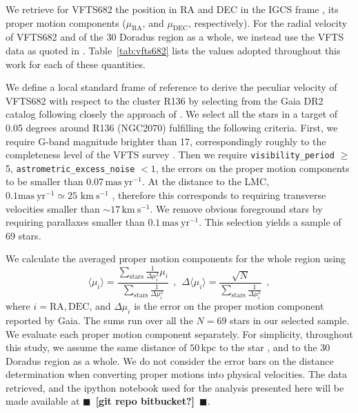 \documentclass[apjl,twocolumn]{emulateapj}
\newcommand{\todo}[1]{{\large $\blacksquare$~\textbf{\color{red}[#1]}}~$\blacksquare$}
\newcommand{\kms}{{\,\mathrm{km\ s^{-1}}}}
\DeclareRobustCommand{\Tabref}[1]{Table~\ref{#1}}
\begin{document}
We retrieve for VFTS682 the position in RA and DEC
in the IGCS frame \cite[][]{brown:18}, its
proper motion components ($\mu_\mathrm{RA}$, and $\mu_\mathrm{DEC}$,
respectively). For the radial velocity of VFTS682 and of the 30 Doradus
region as a whole, we instead use the VFTS data
as quoted in \cite{bestenlehner:11}. \Tabref{tab:vfts682} lists the values adopted throughout
this work for each of these quantities.


We define a local standard frame of reference to derive the peculiar velocity
of VFTS682 with respect to the cluster R136 by selecting from the Gaia DR2 catalog following closely the approach of \cite{vandermarel:02,lennon:18}.
We select all the stars in a target of 0.05 degrees around R136
(NGC2070) fulfilling the following criteria. First, we require G-band
magnitude brighter than 17, correspondingly roughly to the
completeness level of the VFTS survey \citep[here we implicitly assume
G$\sim$V,][]{evans:11}. Then we require \texttt{visibility\_period} $\geq$ 5,
\texttt{astrometric\_excess\_noise} $< 1$, the errors on the proper
motion components to be smaller than 0.07\,$\mathrm{mas\
  yr^{-1}}$. At the distance to the LMC, $0.1\mathrm{mas\
  yr^{-1}}\simeq25\,\kms$ \citep[e.g.,][]{platais:18}, therefore this
corresponds to requiring transverse velocities smaller than $\sim$$17\kms$. We
remove obvious foreground stars by requiring parallaxes smaller than $0.1\,\mathrm{mas\ yr^{-1}}$.
This selection yields a sample of 69 stars.%

We calculate the averaged proper motion components for the whole
region using 
\begin{equation}
  \label{eq:mean}
  \langle \mu_i\rangle = \frac{\sum_\mathrm{stars}\frac{1}{\Delta
      \mu_i^2}\mu_i}{\sum_\mathrm{stars} \frac{1}{\Delta \mu_i^2}} \ \ , \
  \ \Delta \langle \mu_i\rangle = \frac{\sqrt{N}}{\sum_\mathrm{stars}
    \frac{1}{\Delta \mu_i^2}} \ \ ,
\end{equation}
where $i = \mathrm{RA}, \mathrm{DEC}$, and $\Delta \mu_i$ is the error
on the proper motion component reported by Gaia. The sums run over
all the $N=69$ stars in our selected sample. We evaluate each proper motion
component separately. For simplicity, throughout this study, we assume the same
distance of $50$\,kpc to the star \citep[][]{pietrzynski:13}, and to
the 30 Doradus region as a whole. We do not consider the error bars on
the distance determination when converting proper motions into
physical velocities. The data retrieved, and the ipython notebook used for the analysis
presented here will be made available at \todo{git repo bitbucket?}. 
\end{document}
